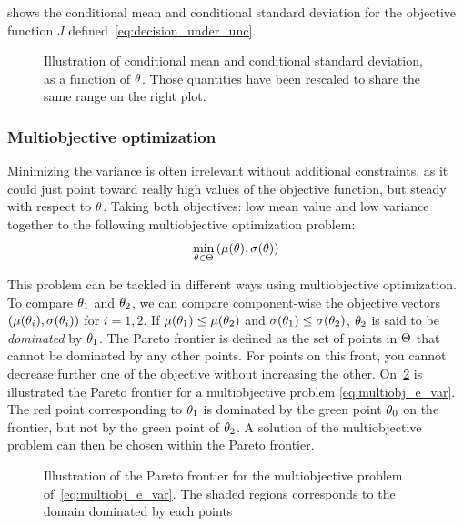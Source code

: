 \documentclass[../../Main_ManuscritThese.tex]{subfiles}
\newcommand\imgpath{/home/victor/acadwriting/Manuscrit/Text/Chapter3/img/}
\begin{document}
 shows the conditional mean and conditional standard deviation for the objective function $J$ defined~\cref{eq:decision_under_unc}.
\begin{figure}[ht]
  \centering
  
  \caption[Conditional mean and standard deviation]{Illustration of conditional mean and conditional standard deviation, as a function of $\theta$. Those quantities have been rescaled to share the same range on the right plot.}
  \label{fig:mean_std} 
\end{figure}

\subsubsection{Multiobjective optimization}
\label{sec:multiobjective_optimization}
Minimizing the variance is often irrelevant without additional constraints, as it could just point toward really high values of the objective function, but steady with respect to $\theta$. Taking both objectives: low mean value and low variance together to the following multiobjective optimization problem:
\begin{align}
  \label{eq:multiobj_e_var}
  \min_{\theta\in\Theta} \left(\mu(\theta),\sigma(\theta)\right)
\end{align}


This problem can be tackled in different ways using multiobjective optimization.
To compare $\theta_1$ and $\theta_2$, we can compare component-wise the
objective vectors $(\mu(\theta_i),\sigma(\theta_i))$ for $i=1,2$. If
$\mu(\theta_1) \leq \mu(\theta_2)$ and $\sigma(\theta_1) \leq \sigma(\theta_2)$,
$\theta_2$ is said to be \emph{dominated} by $\theta_1$. The Pareto frontier
is defined as the set of points in $\Theta$ that cannot be dominated
by any other points. For points on this front, you cannot decrease
further one of the objective without increasing the other.
On~\cref{fig:pareto} is illustrated the Pareto frontier for a
multiobjective problem \cref{eq:multiobj_e_var}. The red point
corresponding to $\theta_1$ is dominated by the green point $\theta_0$ on
the frontier, but not by the green point of $\theta_2$. A solution of the
multiobjective problem can then be chosen within the Pareto frontier.

\begin{figure}[ht]
  \centering
  
  \caption[Pareto frontier]{\label{fig:pareto} 
 Illustration of the Pareto frontier for the multiobjective problem of~\cref{eq:multiobj_e_var}. The shaded regions corresponds to the domain dominated by each points}
\end{figure}
\end{document}
